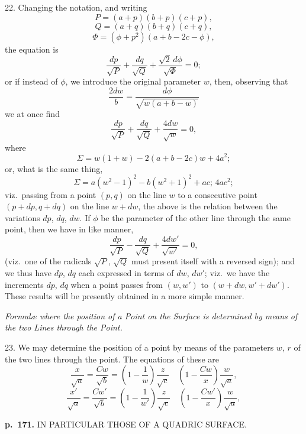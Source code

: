 \documentclass[11pt,a4paper]{article}
\begin{document}
22. Changing the notation, and writing
\[
P = (a + p)(b + p)(c + p),
\]
\[
Q = (a + q)(b + q)(c + q),
\]
\[
\Phi = (\phi + p^2)(a + b - 2c - \phi),
\]
the equation is
\[
\frac{dp}{\sqrt{P}} + \frac{dq}{\sqrt{Q}} + \frac{\sqrt{2}\, d\phi}{\sqrt{\Phi}} = 0;
\]
or if instead of $\phi$, we introduce the original parameter $w$, then, observing that
\[
\frac{2dw}{b} = \frac{d\phi}{\sqrt{w(a+b-w)}}
\]
we at once find
\[
\frac{dp}{\sqrt{P}} + \frac{dq}{\sqrt{Q}} + \frac{4dw}{\sqrt{w}} = 0,
\]
where
\[
\Sigma = w(1 + w) - 2(a + b - 2c)w + 4a^2;
\]
or, what is the same thing,
\[
\Sigma = a(w^2 - 1)^2 - b(w^2 + 1)^2 + ac;\, 4ac^2;
\]
viz.\ passing from a point $(p, q)$ on the line $w$ to a consecutive point $(p + dp, q + dq)$
on the line $w + dw$, the above is the relation between the variations $dp$, $dq$, $dw$.  If $\phi$
be the parameter of the other line through the same point, then we have in like manner,
\[
\frac{dp}{\sqrt{P}} - \frac{dq}{\sqrt{Q}} + \frac{4 dw'}{\sqrt{w'}} = 0,
\]
(viz.\ one of the radicals $\sqrt{P}$, $\sqrt{Q}$ must present itself with a reversed sign); and we
thus have $dp$, $dq$ each expressed in terms of $dw$, $dw'$; viz.\ we have the increments
$dp$, $dq$ when a point passes from $(w, w')$ to $(w + dw, w' + dw')$.  These results will be
presently obtained in a more simple manner.

\textit{Formul\ae{} where the position of a Point on the Surface is determined by means of the two Lines through the Point.}

23. We may determine the position of a point by means of the parameters $w$, $r$
of the two lines through the point.  The equations of these are
\[
\frac{x}{\sqrt{a}} = \frac{Cw}{\sqrt{b}} = \left(1 - \frac{1}{w}\right)\frac{z}{\sqrt{c}} \quad \left(1 - \frac{Cw}{x}\right) \frac{w}{\sqrt{a}},
\]
\[
\frac{x'}{\sqrt{a}} = \frac{Cw'}{\sqrt{b}} = \left(1 - \frac{1}{w'}\right)\frac{z}{\sqrt{c}} \quad \left(1 - \frac{Cw'}{x}\right) \frac{w}{\sqrt{a}},
\]

\clearpage

\noindent
\textbf{p.~171.}  IN PARTICULAR THOSE OF A QUADRIC SURFACE.
\end{document}
